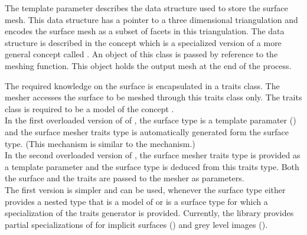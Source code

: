 The template parameter  describes 
the data structure
used to store  the surface mesh. This data structure
has a pointer to a three dimensional triangulation and encodes
the surface mesh as a subset of facets in this triangulation.
The data structure is described in the concept
 which is a specialized version
of a more general concept called  .
An object of this class is passed by reference to the meshing
function. This object holds the output mesh at the end of the
process.

The required knowledge on the surface is encapsulated in a
traits class. The mesher accesses the surface to be meshed
through this traits class only. 
The traits class is required to be a model
of the concept . \\
In the first  overloaded version of
of , the surface type is a template paramater  ()
and the surface mesher traits type 
is  automatically generated form the surface type.  
(This mechanism is similar to the 
  mechanism.) \\
In the second overloaded version of , the surface mesher traits type is provided
as a template parameter 
and the surface type is deduced from this traits type.
Both the surface and the traits 
are passed to the mesher as parameters. \\
The first version is simpler and can be used,
whenever the surface type either provides  a nested type
that is  a model of 
or is a surface type for which a specialization
of the traits generator 
is provided.
Currently, the library provides partial specializations
of  
for implicit surfaces () and 
grey level images ().



